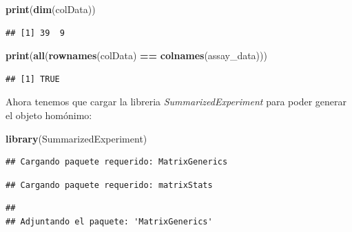 \documentclass[
]{article}
\newenvironment{Shaded}{\begin{snugshade}}{\end{snugshade}}
\newcommand{\FunctionTok}[1]{\textcolor[rgb]{0.13,0.29,0.53}{\textbf{#1}}}
\newcommand{\NormalTok}[1]{#1}
\newcommand{\SpecialCharTok}[1]{\textcolor[rgb]{0.81,0.36,0.00}{\textbf{#1}}}
\begin{document}
\begin{Shaded}
\begin{Highlighting}[]
\FunctionTok{print}\NormalTok{(}\FunctionTok{dim}\NormalTok{(colData))}
\end{Highlighting}
\end{Shaded}

\begin{verbatim}
## [1] 39  9
\end{verbatim}

\begin{Shaded}
\begin{Highlighting}[]
\FunctionTok{print}\NormalTok{(}\FunctionTok{all}\NormalTok{(}\FunctionTok{rownames}\NormalTok{(colData) }\SpecialCharTok{==} \FunctionTok{colnames}\NormalTok{(assay\_data)))}
\end{Highlighting}
\end{Shaded}

\begin{verbatim}
## [1] TRUE
\end{verbatim}

Ahora tenemos que cargar la libreria \emph{SummarizedExperiment} para
poder generar el objeto homónimo:

\begin{Shaded}
\begin{Highlighting}[]
\FunctionTok{library}\NormalTok{(SummarizedExperiment)}
\end{Highlighting}
\end{Shaded}

\begin{verbatim}
## Cargando paquete requerido: MatrixGenerics
\end{verbatim}

\begin{verbatim}
## Cargando paquete requerido: matrixStats
\end{verbatim}

\begin{verbatim}
## 
## Adjuntando el paquete: 'MatrixGenerics'
\end{verbatim}
\end{document}
